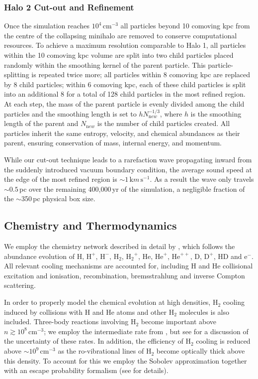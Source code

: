 \documentclass{thesis}
\newcommand{\cc}{\ensuremath{\,\mathrm{cm}^{-3}}\xspace}
\newcommand{\htwo}{\ensuremath{\mathrm{H}_2}\xspace}
\newcommand{\hd}{\ensuremath{\mathrm{HD}}\xspace}
\newcommand{\deut}{\ensuremath{\mathrm{D}}\xspace}
\newcommand{\h}{\ensuremath{\mathrm{H}}\xspace}
\newcommand{\hplus}{\ensuremath{\mathrm{H}^+}\xspace}
\newcommand{\hminus}{\ensuremath{\mathrm{H}^-}\xspace}
\newcommand{\he}{\ensuremath{\mathrm{He}}\xspace}
\newcommand{\heplus}{\ensuremath{\mathrm{He}^+}\xspace}
\begin{document}
\subsubsection{Halo 2 Cut-out and Refinement}
\label{cutout}

Once the simulation reaches $10^4\cc$ all particles beyond 10 comoving kpc from the centre of the collapsing minihalo are removed to conserve computational resources. 
To achieve a maximum resolution comparable to Halo 1, all particles within the 10 comoving kpc volume are split into two child particles placed randomly within the smoothing kernel of the parent particle.  
This particle-splitting is repeated twice more; all particles within 8 comoving kpc are replaced by 8 child particles; within 6 comoving kpc, each of these child particles is split into an additional 8 for a total of 128 child particles in the most refined region.  
At each step, the mass of the parent particle is evenly divided among the child particles and the smoothing length is set to $h N_{\mathrm new}^{-1/3}$, where $h$ is the smoothing length of the parent and $N_{\mathrm new}$ is the number of child particles created.  
All particles inherit the same entropy, velocity, and chemical abundances as their parent, ensuring conservation of mass, internal energy, and momentum.

While our cut-out technique leads to a rarefaction wave propagating inward from the suddenly introduced vacuum boundary condition, the average sound speed at the edge of the most refined region is $\sim$$1\,{\mathrm km}\,{\mathrm s}^{-1}$.  
As a result the wave only travels $\sim$$0.5\,$pc over the remaining 400,000$\,$yr of the simulation, a negligible fraction of the $\sim$350$\,$pc physical box size.

\subsection{Chemistry and Thermodynamics}
\label{chemistry}
 We employ the chemistry network described in detail by \citet{Greifetal2009b}, which follows the abundance evolution of $\h$, $\hplus$, $\hminus$, $\htwo$, $\htwo^+$, $\he$, $\heplus$, $\he^{++}$, $\deut$, $\deut^+$, $\hd$ and e$^-$. 
 All relevant cooling mechanisms are accounted for, including $\h$ and $\he$ collisional excitation and ionisation, recombination, bremsstrahlung and inverse Compton scattering. 
 
 In order to properly model the chemical evolution at high densities, $\htwo$ cooling induced by collisions with $\h$ and $\he$ atoms and other $\htwo$ molecules is also included.  
 Three-body reactions involving $\htwo$ become important above $n \gtrsim 10^8\cc$; we employ the intermediate rate from \citet{PallaSalpeterStahler1983}, but see \citet{Turketal2011} for a discussion of the uncertainty of these rates. 
 In addition, the efficiency of $\htwo$ cooling is reduced above $\sim$$10^9\cc$ as the ro-vibrational lines of $\htwo$ become optically thick above this density.  
 To account for this we employ the Sobolev approximation together with an escape probability formalism (see \citealt{Yoshidaetal2006, Greifetal2011} for details). 
\end{document}
